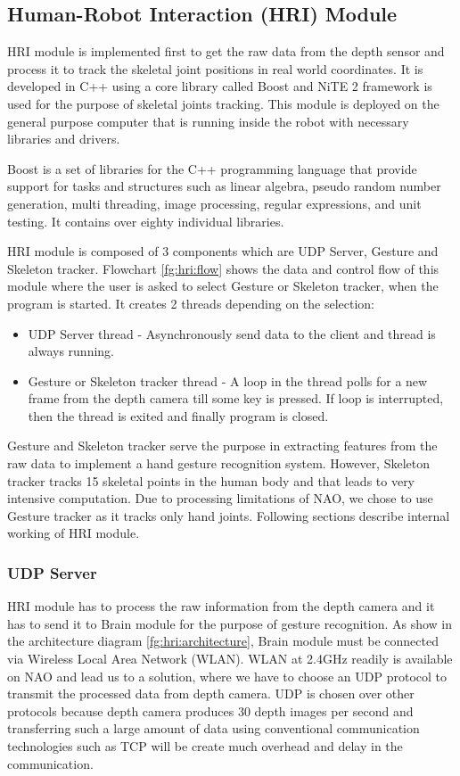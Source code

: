 \subsection{Human-Robot Interaction (HRI) Module} HRI module is implemented first to get the raw data from the depth sensor and process it to track the skeletal joint positions in real world coordinates. It is developed in C++ using a core library called Boost and NiTE 2 framework is used for the purpose of skeletal joints tracking. This module is deployed on the general purpose computer that is running inside the robot with necessary libraries and drivers.

Boost is a set of libraries for the C++ programming language that provide support for tasks and structures such as linear algebra, pseudo random number generation, multi threading, image processing, regular expressions, and unit testing. It contains over eighty individual libraries.

HRI module is composed of 3 components which are UDP Server, Gesture and Skeleton tracker. Flowchart \ref{fg:hri:flow} shows the data and control flow of this module where the user is asked to select Gesture or Skeleton tracker, when the program is started. It creates 2 threads depending on the selection: 
\begin{itemize}
	\item UDP Server thread - Asynchronously send data to the client and thread is always running. 
	\item Gesture or Skeleton tracker thread - A loop in the thread polls for a new frame from the depth camera till some key is pressed. If loop is interrupted, then the thread is exited and finally program is closed. 
\end{itemize}

Gesture and Skeleton tracker serve the purpose in extracting features from the raw data to implement a hand gesture recognition system. However, Skeleton tracker tracks 15 skeletal points in the human body and that leads to very intensive computation. Due to processing limitations of NAO, we chose to use Gesture tracker as it tracks only hand joints. Following sections describe internal working of HRI module.



\subsubsection{UDP Server} HRI module has to process the raw information from the depth camera and it has to send it to Brain module for the purpose of gesture recognition. As show in the architecture diagram \ref{fg:hri:architecture}, Brain module must be connected via Wireless Local Area Network (WLAN). WLAN at 2.4GHz readily is available on NAO and lead us to a solution, where we have to choose an UDP protocol to transmit the processed data from depth camera. UDP is chosen over other protocols because depth camera produces 30 depth images per second and transferring such a large amount of data using conventional communication technologies such as TCP will be create much overhead and delay in the communication.

